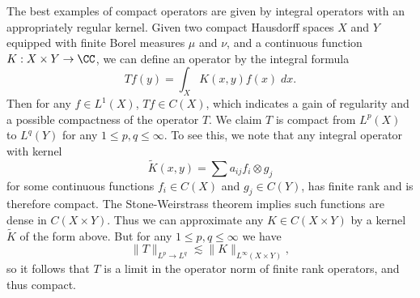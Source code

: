 \begin{example}
    The best examples of compact operators are given by integral operators with an appropriately regular kernel. Given two compact Hausdorff spaces $X$ and $Y$ equipped with finite Borel measures $\mu$ and $\nu$, and a continuous function $K: X \times Y \to \CC$, we can define an operator by the integral formula
    \[ Tf(y) = \int_X K(x,y) f(x)\; dx. \]
    Then for any $f \in L^1(X)$, $Tf \in C(X)$, which indicates a gain of regularity and a possible compactness of the operator $T$. We claim $T$ is compact from $L^p(X)$ to $L^q(Y)$ for any $1 \leq p,q \leq \infty$. To see this, we note that any integral operator with kernel
    \[ \tilde{K}(x,y) = \sum a_{ij} f_i \otimes g_j \]
    for some continuous functions $f_i \in C(X)$ and $g_j \in C(Y)$, has finite rank and is therefore compact. The Stone-Weirstrass theorem implies such functions are dense in $C(X \times Y)$. Thus we can approximate any $K \in C(X \times Y)$ by a kernel $\tilde{K}$ of the form above. But for any $1 \leq p,q \leq \infty$ we have
    \[ \| T \|_{L^p \to L^q} \lesssim \| K \|_{L^\infty(X \times Y)}, \]
    so it follows that $T$ is a limit in the operator norm of finite rank operators, and thus compact.
\end{example}

